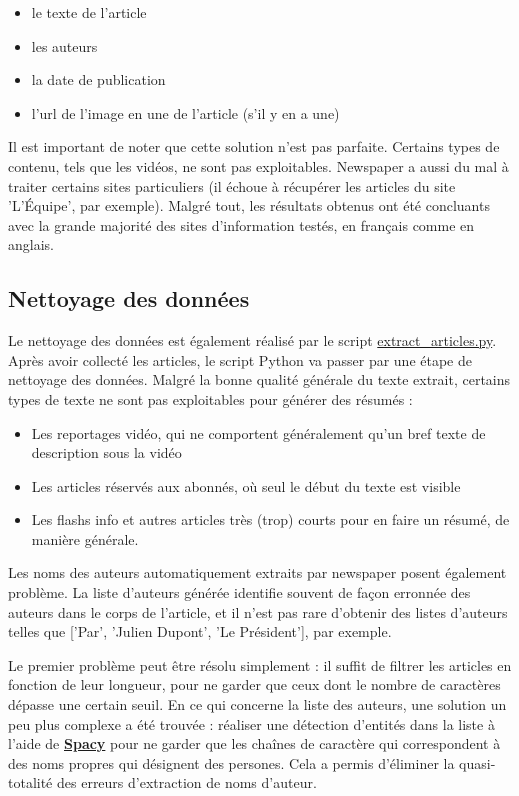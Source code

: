 \documentclass[french]{article}
\begin{document}
    \begin{itemize}
        \item le texte de l'article
        \item les auteurs
        \item la date de publication
        \item l'url de l'image en une de l'article (s'il y en a une)
    \end{itemize}
    Il est important de noter que cette solution n'est pas parfaite. Certains types de contenu, tels que les vidéos, ne sont pas exploitables. Newspaper a aussi du mal à traiter certains sites particuliers (il échoue à récupérer les articles du site 'L'Équipe', par exemple). Malgré tout, les résultats obtenus ont été concluants avec la grande majorité des sites d'information testés, en français comme en anglais.

    \subsection{Nettoyage des données}
    Le nettoyage des données est également réalisé par le script \href{https://github.com/vinpap/your_news_anchor/blob/main/extract_articles.py}{extract\_articles.py}.
    Après avoir collecté les articles, le script Python va passer par une étape de nettoyage des données. Malgré la bonne qualité générale du texte extrait, certains types de texte ne sont pas exploitables pour générer des résumés :
    \begin{itemize}
        \item Les reportages vidéo, qui ne comportent généralement qu'un bref texte de description sous la vidéo
        \item Les articles réservés aux abonnés, où seul le début du texte est visible
        \item Les flashs info et autres articles très (trop) courts pour en faire un résumé, de manière générale.
    \end{itemize}
    Les noms des auteurs automatiquement extraits par newspaper posent également problème. La liste d'auteurs générée identifie souvent de façon erronnée des auteurs dans le corps de l'article, et il n'est pas rare d'obtenir des listes d'auteurs telles que ['Par', 'Julien Dupont', 'Le Président'], par exemple.

    Le premier problème peut être résolu simplement : il suffit de filtrer les articles en fonction de leur longueur, pour ne garder que ceux dont le nombre de caractères dépasse une certain seuil.
    En ce qui concerne la liste des auteurs, une solution un peu plus complexe a été trouvée : réaliser une détection d'entités dans la liste à l'aide de \textbf{\href{https://spacy.io/}{Spacy}} pour ne garder que les chaînes de caractère qui correspondent à des noms propres qui désignent des persones. Cela a permis d'éliminer la quasi-totalité des erreurs d'extraction de noms d'auteur.
\end{document}
